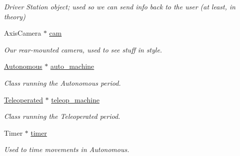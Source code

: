 \begin{DoxyCompactItemize}
\begin{DoxyCompactList}\small\item\em Driver Station object; used so we can send info back to the user (at least, in theory) \item\end{DoxyCompactList}\item 
\hypertarget{class_builtin_default_code_aef2c4c3029fc5446af5117125ffdc555}{
AxisCamera $\ast$ \hyperlink{class_builtin_default_code_aef2c4c3029fc5446af5117125ffdc555}{cam}}
\label{class_builtin_default_code_aef2c4c3029fc5446af5117125ffdc555}

\begin{DoxyCompactList}\small\item\em Our rear-\/mounted camera, used to see stuff in style. \item\end{DoxyCompactList}\item 
\hypertarget{class_builtin_default_code_a23fafbc7100e3b5b50408d010b5f609b}{
\hyperlink{class_r_j_f_r_c2011_1_1_autonomous}{Autonomous} $\ast$ \hyperlink{class_builtin_default_code_a23fafbc7100e3b5b50408d010b5f609b}{auto\_\-machine}}
\label{class_builtin_default_code_a23fafbc7100e3b5b50408d010b5f609b}

\begin{DoxyCompactList}\small\item\em Class running the Autonomous period. \item\end{DoxyCompactList}\item 
\hypertarget{class_builtin_default_code_ad31f83ef30fd7bbb3bbe22895dfb9c99}{
\hyperlink{class_r_j_f_r_c2011_1_1_teleoperated}{Teleoperated} $\ast$ \hyperlink{class_builtin_default_code_ad31f83ef30fd7bbb3bbe22895dfb9c99}{teleop\_\-machine}}
\label{class_builtin_default_code_ad31f83ef30fd7bbb3bbe22895dfb9c99}

\begin{DoxyCompactList}\small\item\em Class running the Teleoperated period. \item\end{DoxyCompactList}\item 
\hypertarget{class_builtin_default_code_aaf59606d706817c312686afcd1f8f527}{
Timer $\ast$ \hyperlink{class_builtin_default_code_aaf59606d706817c312686afcd1f8f527}{timer}}
\label{class_builtin_default_code_aaf59606d706817c312686afcd1f8f527}

\begin{DoxyCompactList}\small\item\em Used to time movements in Autonomous. \item\end{DoxyCompactList}\end{DoxyCompactItemize}


